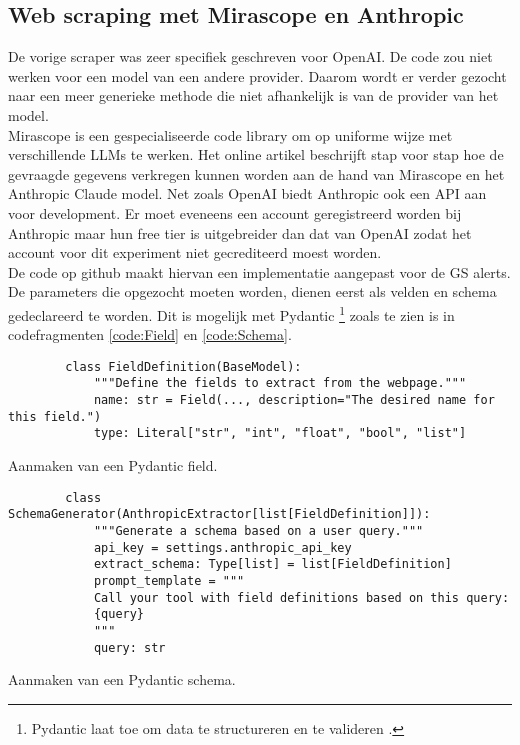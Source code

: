\subsection{Web scraping met Mirascope en Anthropic}
De vorige scraper was zeer specifiek geschreven voor OpenAI. De code zou niet werken voor een model van een andere provider. Daarom wordt er verder gezocht naar een meer generieke methode die niet afhankelijk is van de provider van het model.\\
Mirascope \textcite{Mirascope2025} is een gespecialiseerde code library om op uniforme wijze met verschillende LLMs te werken.
Het online artikel \textcite{Anthropic2025} beschrijft stap voor stap hoe de gevraagde gegevens verkregen kunnen worden aan de hand van Mirascope en het Anthropic Claude model. Net zoals OpenAI biedt Anthropic ook een API \autocite{Anthropicmodel2025} aan voor development. Er moet eveneens een account geregistreerd worden bij Anthropic maar hun free tier is uitgebreider dan dat van OpenAI zodat het account voor dit experiment niet gecrediteerd moest worden.\\
De code op github \textcite{Depaepeanthropic2025} maakt hiervan een implementatie aangepast voor de GS alerts.
De parameters die opgezocht moeten worden, dienen eerst als velden en schema gedeclareerd te worden. Dit is mogelijk met Pydantic \footnote{Pydantic laat toe om data te structureren en te valideren \autocite{Pydantic2025}.} zoals te zien is in codefragmenten \ref{code:Field} en \ref{code:Schema}.
\begin{listing}[h!]
    \begin{verbatim}
        class FieldDefinition(BaseModel):
            """Define the fields to extract from the webpage."""
            name: str = Field(..., description="The desired name for this field.")
            type: Literal["str", "int", "float", "bool", "list"]
    \end{verbatim}
    \caption[Pydantic field]{Aanmaken van een Pydantic field.}
    \label{code:Field}
\end{listing}
\begin{listing}[h!]
    \begin{verbatim}
        class SchemaGenerator(AnthropicExtractor[list[FieldDefinition]]):
            """Generate a schema based on a user query."""
            api_key = settings.anthropic_api_key
            extract_schema: Type[list] = list[FieldDefinition]
            prompt_template = """
            Call your tool with field definitions based on this query:
            {query}
            """
            query: str
    \end{verbatim}
    \caption[Pydantic schema]{Aanmaken van een Pydantic schema.}
    \label{code:Schema}
\end{listing}
